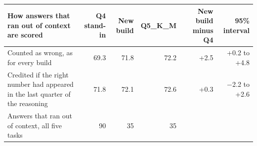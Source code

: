 \begin{tabularx}{\textwidth}{@{}Xrrrrr@{}}
\toprule
How answers that ran out of context are scored & Q4 stand-in & New build & Q5\_K\_M & New build minus Q4 & 95\% interval \\
\midrule
Counted as wrong, as for every build & 69.3 & 71.8 & 72.2 & +2.5 & +0.2 to +4.8 \\
Credited if the right number had appeared in the last quarter of the reasoning & 71.8 & 72.1 & 72.6 & +0.3 & $-$2.2 to +2.6 \\
\midrule
Answers that ran out of context, all five tasks & 90 & 35 & 35 & & \\
\bottomrule
\end{tabularx}
